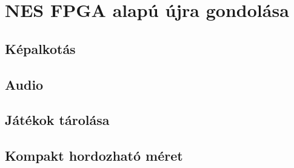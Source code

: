 \chapter{NES FPGA alapú újra gondolása}

\section{Képalkotás}

\section{Audio}

\section{Játékok tárolása}

\section{Kompakt hordozható méret}


